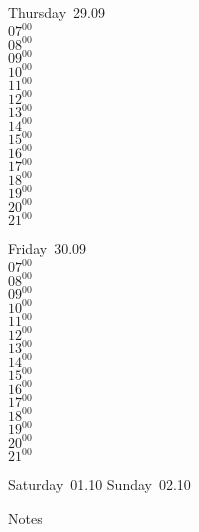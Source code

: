 \documentclass[11pt,a4paper]{book}\usepackage[]{graphicx}\usepackage[]{color}
\begin{document}
\clearpage
\begin{headerbox}
\end{headerbox}
\begin{weekdaybox}
  Thursday~29.09\\
  { 
  \vfill
  $07^{00}$\\
$08^{00}$\\
$09^{00}$\\
$10^{00}$\\
$11^{00}$\\
$12^{00}$\\
$13^{00}$\\
$14^{00}$\\
$15^{00}$\\
$16^{00}$\\
$17^{00}$\\
$18^{00}$\\
$19^{00}$\\
$20^{00}$\\
$21^{00}$\\
  }
\end{weekdaybox} 
\begin{weekdaybox}
  Friday~30.09\\
  { 
  \vfill
  $07^{00}$\\
$08^{00}$\\
$09^{00}$\\
$10^{00}$\\
$11^{00}$\\
$12^{00}$\\
$13^{00}$\\
$14^{00}$\\
$15^{00}$\\
$16^{00}$\\
$17^{00}$\\
$18^{00}$\\
$19^{00}$\\
$20^{00}$\\
$21^{00}$\\
  }
\end{weekdaybox}
\begin{weekendbox}
  Saturday~01.10
  \tcblower
  Sunday~02.10
\end{weekendbox} %
\begin{notebox}
  Notes
\end{notebox}
\clearpage
\end{document}
